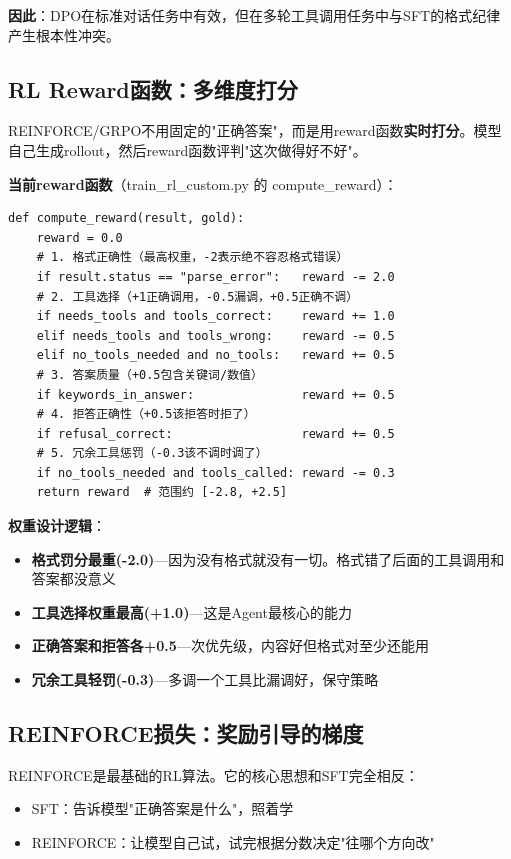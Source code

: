 \documentclass[fontset=none,11pt,a4paper]{ctexart}
\begin{document}
\textbf{因此}：DPO在标准对话任务中有效，但在多轮工具调用任务中与SFT的格式纪律产生根本性冲突。

\subsection{RL Reward函数：多维度打分}

REINFORCE/GRPO不用固定的"正确答案"，而是用reward函数\textbf{实时打分}。模型自己生成rollout，然后reward函数评判"这次做得好不好"。

\textbf{当前reward函数}（train\_rl\_custom.py 的 compute\_reward）：

\begin{lstlisting}
def compute_reward(result, gold):
    reward = 0.0
    # 1. 格式正确性（最高权重，-2表示绝不容忍格式错误）
    if result.status == "parse_error":   reward -= 2.0
    # 2. 工具选择（+1正确调用，-0.5漏调，+0.5正确不调）
    if needs_tools and tools_correct:    reward += 1.0
    elif needs_tools and tools_wrong:    reward -= 0.5
    elif no_tools_needed and no_tools:   reward += 0.5
    # 3. 答案质量（+0.5包含关键词/数值）
    if keywords_in_answer:               reward += 0.5
    # 4. 拒答正确性（+0.5该拒答时拒了）
    if refusal_correct:                  reward += 0.5
    # 5. 冗余工具惩罚（-0.3该不调时调了）
    if no_tools_needed and tools_called: reward -= 0.3
    return reward  # 范围约 [-2.8, +2.5]
\end{lstlisting}

\textbf{权重设计逻辑}：
\begin{itemize}[nosep]
    \item \textbf{格式罚分最重(-2.0)}---因为没有格式就没有一切。格式错了后面的工具调用和答案都没意义
    \item \textbf{工具选择权重最高(+1.0)}---这是Agent最核心的能力
    \item \textbf{正确答案和拒答各+0.5}---次优先级，内容好但格式对至少还能用
    \item \textbf{冗余工具轻罚(-0.3)}---多调一个工具比漏调好，保守策略
\end{itemize}

\subsection{REINFORCE损失：奖励引导的梯度}

REINFORCE是最基础的RL算法。它的核心思想和SFT完全相反：

\begin{itemize}[nosep]
    \item SFT：告诉模型"正确答案是什么"，照着学
    \item REINFORCE：让模型自己试，试完根据分数决定"往哪个方向改"
\end{itemize}
\end{document}
